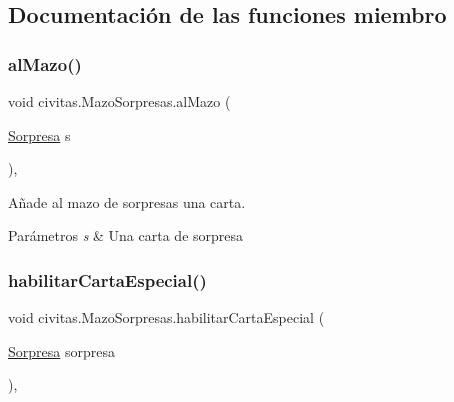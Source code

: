 \subsection{Documentación de las funciones miembro}
\mbox{\label{classcivitas_1_1MazoSorpresas_a36fbdb305c6555817f1078dec430eddb}} 
\subsubsection{\texorpdfstring{al\+Mazo()}{alMazo()}}
{\footnotesize\ttfamily void civitas.\+Mazo\+Sorpresas.\+al\+Mazo (\begin{DoxyParamCaption}\item[{\hyperlink{classcivitas_1_1Sorpresa}{Sorpresa}}]{s }\end{DoxyParamCaption})\hspace{0.3cm}{\ttfamily [inline]}, {\ttfamily [package]}}



Añade al mazo de sorpresas una carta. 


\begin{DoxyParams}{Parámetros}
{\em s} & Una carta de sorpresa \\
\hline
\end{DoxyParams}
\mbox{\label{classcivitas_1_1MazoSorpresas_a285260ff3aab3eb49c41d4d274b9dcc1}} 
\subsubsection{\texorpdfstring{habilitar\+Carta\+Especial()}{habilitarCartaEspecial()}}
{\footnotesize\ttfamily void civitas.\+Mazo\+Sorpresas.\+habilitar\+Carta\+Especial (\begin{DoxyParamCaption}\item[{\hyperlink{classcivitas_1_1Sorpresa}{Sorpresa}}]{sorpresa }\end{DoxyParamCaption})\hspace{0.3cm}{\ttfamily [inline]}, {\ttfamily [package]}}



